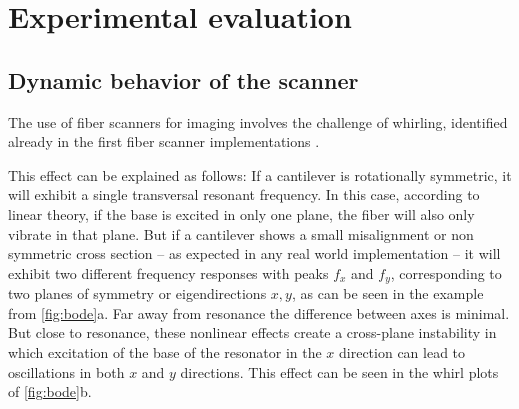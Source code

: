 \documentclass[10pt]{iopart}
\begin{document}
\section{Experimental evaluation}

\subsection{Dynamic behavior of the scanner}
\label{sec:whirling}
The use of fiber scanners for imaging involves the challenge of whirling, identified already in the first fiber scanner implementations \cite{Seibel2001}.

This effect can be explained as follows: If a cantilever is rotationally symmetric, it will exhibit a single transversal resonant frequency. In this case, according to linear theory, if the base is excited in only one plane, the fiber will also only vibrate in that plane. But if a cantilever shows a small misalignment or non symmetric cross section -- as expected in any real world implementation -- it will exhibit two different frequency responses with peaks $f_x$ and $f_y$, corresponding to two planes of symmetry or eigendirections $x,y$, as can be seen in the example from \autoref{fig:bode}a. Far away from resonance the difference between axes is minimal. But close to resonance, these nonlinear effects create a cross-plane instability in which excitation of the base of the resonator in the $x$ direction can lead to oscillations in both $x$ and $y$ directions. This effect can be seen in the whirl plots of \autoref{fig:bode}b. 
\end{document}
